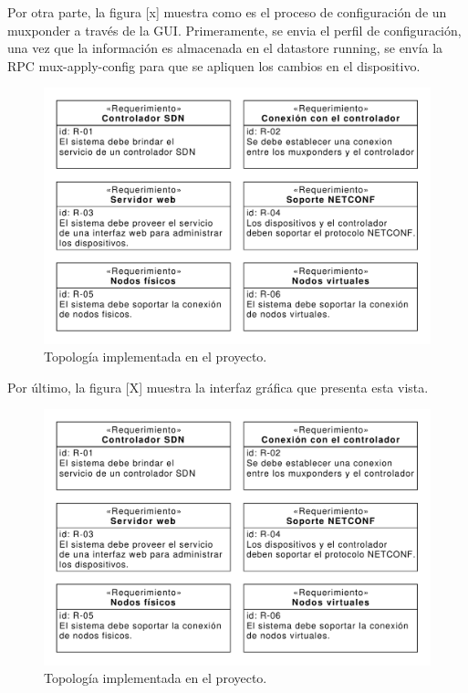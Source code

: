\begin{itemize}
    Por otra parte, la figura [x] muestra como es el proceso de configuración de un muxponder a través de la GUI. Primeramente, se envia el perfil de configuración, una vez que la información es almacenada en el datastore running, se envía la RPC mux-apply-config para que se apliquen los cambios en el dispositivo.

    \begin{figure}[H]
        \centering
        \includegraphics[scale=0.65]{Figures/req_sys.pdf}
        \caption{Topología implementada en el proyecto.}
        \label{fig:req_sys}
      \end{figure}

    Por último, la figura [X] muestra la interfaz gráfica que presenta esta vista.

      \begin{figure}[H]
        \centering
        \includegraphics[scale=0.65]{Figures/req_sys.pdf}
        \caption{Topología implementada en el proyecto.}
        \label{fig:req_sys}
      \end{figure}


\end{itemize}
